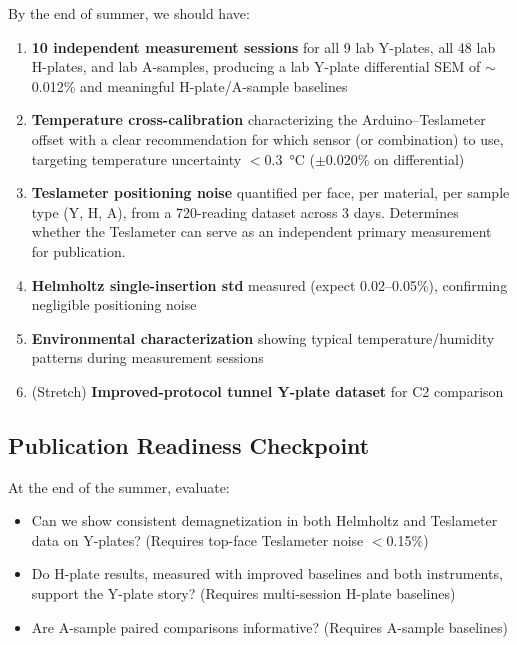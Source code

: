 \documentclass[11pt,letterpaper]{article}
\begin{document}
By the end of summer, we should have:

\begin{enumerate}
  \item \textbf{10 independent measurement sessions} for all 9 lab Y-plates, all
    48 lab H-plates, and lab A-samples, producing a lab Y-plate differential SEM
    of ${\sim}$0.012\% and meaningful H-plate/A-sample baselines

  \item \textbf{Temperature cross-calibration} characterizing the
    Arduino--Teslameter offset with a clear recommendation for which sensor (or
    combination) to use, targeting temperature uncertainty
    $<$\SI{0.3}{\degreeCelsius} ($\pm 0.020\%$ on differential)

  \item \textbf{Teslameter positioning noise} quantified per face, per material,
    per sample type (Y, H, A), from a 720-reading dataset across 3 days.
    Determines whether the Teslameter can serve as an independent primary
    measurement for publication.

  \item \textbf{Helmholtz single-insertion std} measured (expect 0.02--0.05\%),
    confirming negligible positioning noise

  \item \textbf{Environmental characterization} showing typical
    temperature/humidity patterns during measurement sessions

  \item (Stretch) \textbf{Improved-protocol tunnel Y-plate dataset} for C2
    comparison
\end{enumerate}

\subsection{Publication Readiness Checkpoint}

At the end of the summer, evaluate:
\begin{itemize}[nosep]
  \item Can we show consistent demagnetization in both Helmholtz and Teslameter
    data on Y-plates? (Requires top-face Teslameter noise $<$0.15\%)
  \item Do H-plate results, measured with improved baselines and both
    instruments, support the Y-plate story? (Requires multi-session H-plate
    baselines)
  \item Are A-sample paired comparisons informative? (Requires A-sample
    baselines)
\end{itemize}
\end{document}
